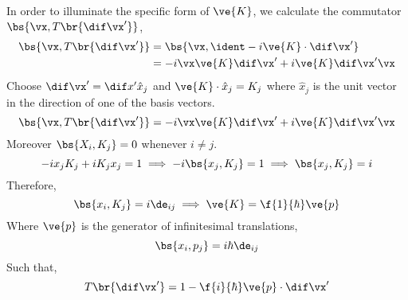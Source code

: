 \documentclass{article}
\begin{document}
In order to illuminate the specific form of $\ve{K}$, we calculate the commutator $\bs{\vx, T\br{\dif \vx'}}$,
\begin{align*}
\bs{\vx, T\br{\dif \vx'}} &= \bs{\vx, \ident - i \ve{K}\cdot\dif\vx'} \\
&= -i \vx \ve{K} \dif \vx' + i \ve{K} \dif \vx' \vx
\end{align*}
Choose $\dif \vx' = \dif x' \hat{x}_j$ and $\ve{K} \cdot \hat{x}_j = K_j$ where $\hat{x}_j$ is the unit vector in the direction of one of the basis vectors.
\[ \bs{\vx, T\br{\dif \vx'}} = -i \vx \ve{K} \dif \vx' + i \ve{K} \dif \vx' \vx \]
Moreover $\bs{X_i, K_j} = 0$ whenever $i \neq j$.
\[ -i x_j K_j + i K_j x_j = 1 \implies -i \bs{x_j, K_j} = 1 \implies \bs{x_j, K_j} = i \]
Therefore,
\[ \bs{x_i, K_j} = i \de_{ij} \implies \ve{K} = \f{1}{\hbar} \ve{p} \]
Where $\ve{p}$ is the generator of infinitesimal translations,
\[ \bs{x_i, p_j} = i \hbar \de_{ij} \]
Such that,
\[ T\br{\dif \vx'} = 1 - \f{i}{\hbar} \ve{p} \cdot \dif \vx' \]
\end{document}
